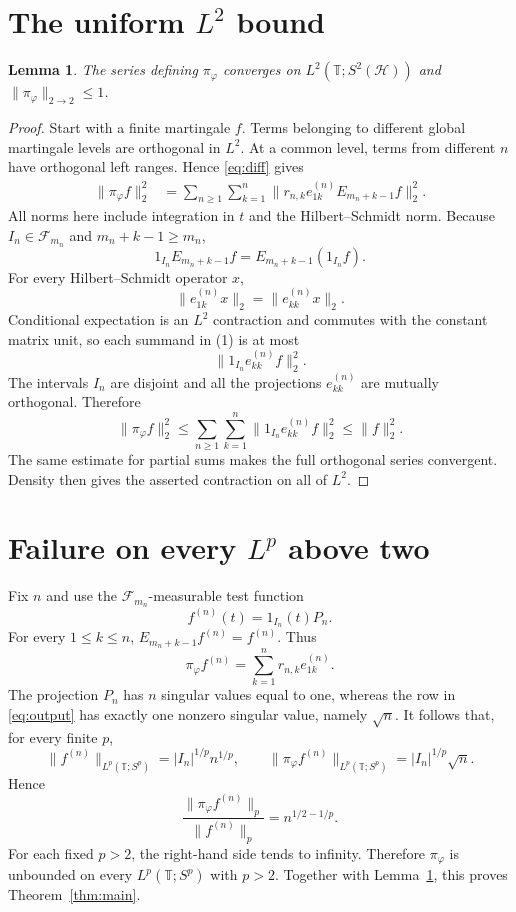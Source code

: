 \documentclass[11pt]{article}
\newtheorem{lemma}{Lemma}
\newcommand{\T}{\mathbb T}
\newcommand{\F}{\mathcal F}
\begin{document}
\section{The uniform \texorpdfstring{$L^2$}{L2} bound}

\begin{lemma}\label{lem:l2}
The series defining $\pi_\varphi$ converges on
$L^2(\T;S^2(\mathcal H))$ and $\|\pi_\varphi\|_{2\to2}\leq1$.
\end{lemma}

\begin{proof}
Start with a finite martingale $f$.  Terms belonging to different global
martingale levels are orthogonal in $L^2$.  At a common level, terms from
different $n$ have orthogonal left ranges.  Hence \eqref{eq:diff} gives
\begin{align*}
 \|\pi_\varphi f\|_2^2
 &=\sum_{n\geq1}\sum_{k=1}^n
   \bigl\|r_{n,k}e_{1k}^{(n)}E_{m_n+k-1}f\bigr\|_2^2. \tag{1}
\end{align*}
All norms here include integration in $t$ and the Hilbert--Schmidt norm.
Because $I_n\in\F_{m_n}$ and $m_n+k-1\geq m_n$,
\[
 1_{I_n}E_{m_n+k-1}f
 =E_{m_n+k-1}(1_{I_n}f).
\]
For every Hilbert--Schmidt operator $x$,
\[
 \|e_{1k}^{(n)}x\|_2=\|e_{kk}^{(n)}x\|_2.
\]
Conditional expectation is an $L^2$ contraction and commutes with the
constant matrix unit, so each summand in (1) is at most
\[
 \|1_{I_n}e_{kk}^{(n)}f\|_2^2.
\]
The intervals $I_n$ are disjoint and all the projections
$e_{kk}^{(n)}$ are mutually orthogonal.  Therefore
\[
 \|\pi_\varphi f\|_2^2
 \leq\sum_{n\geq1}\sum_{k=1}^n
 \|1_{I_n}e_{kk}^{(n)}f\|_2^2
 \leq\|f\|_2^2.
\]
The same estimate for partial sums makes the full orthogonal series
convergent.  Density then gives the asserted contraction on all of $L^2$.
\end{proof}

\section{Failure on every \texorpdfstring{$L^p$}{Lp} above two}

Fix $n$ and use the $\F_{m_n}$-measurable test function
\[
 f^{(n)}(t)=1_{I_n}(t)P_n.
\]
For every $1\leq k\leq n$,
$E_{m_n+k-1}f^{(n)}=f^{(n)}$.  Thus
\begin{equation}\label{eq:output}
 \pi_\varphi f^{(n)}
 =\sum_{k=1}^n r_{n,k}e_{1k}^{(n)}.
\end{equation}
The projection $P_n$ has $n$ singular values equal to one, whereas the
row in \eqref{eq:output} has exactly one nonzero singular value, namely
$\sqrt n$.  It follows that, for every finite $p$,
\[
 \|f^{(n)}\|_{L^p(\T;S^p)}=|I_n|^{1/p}n^{1/p},
 \qquad
 \|\pi_\varphi f^{(n)}\|_{L^p(\T;S^p)}
 =|I_n|^{1/p}\sqrt n.
\]
Hence
\begin{equation}\label{eq:ratio}
 \frac{\|\pi_\varphi f^{(n)}\|_p}{\|f^{(n)}\|_p}
 =n^{1/2-1/p}.
\end{equation}
For each fixed $p>2$, the right-hand side tends to infinity.  Therefore
$\pi_\varphi$ is unbounded on every $L^p(\T;S^p)$ with $p>2$.
Together with Lemma~\ref{lem:l2}, this proves Theorem~\ref{thm:main}.
\end{document}
